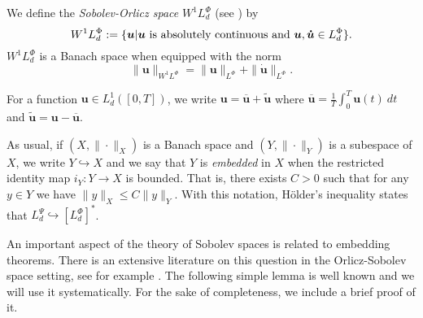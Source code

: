 \documentclass[twoside]{article}
\newcounter{nota_fer_cont}
\theoremstyle{remark}
\newcommand{\orlnor}{\|_{L^{\Phi}}}
\newcommand{\lphi}{L^{\Phi}}
\newcommand{\lpsi}{L^{\Psi}}
\newcommand{\ephi}{E^{\Phi}}
\newcommand{\claseor}{C^{\Phi}}
\newcommand{\wphi}{W^{1}\lphi}
\renewcommand{\b}[1]{\boldsymbol{#1}}
\renewcommand{\leq}{\leqslant}
\begin{document}

We define the \emph{Sobolev-Orlicz space} $\wphi_d$ (see \cite{adams_sobolev}) by
\[\wphi_d:=\{\b{u}| \b{u} \hbox{ is absolutely continuous and } \b{u},\b{\dot{u}}\in \lphi_d\}.\]
$\wphi_d$ is a Banach space when equipped with the norm
\[
\|  \b{u}  \|_{\wphi}= \|  \b{u}  \|_{\lphi} + \|\b{\dot{u}}\orlnor.
\]



For a  function $\b{u}\in L^1_d([0,T])$, we write $\b{u}=\overline{\b{u}}+\widetilde{\b{u}}$ where $\overline{\b{u}} =\frac1T\int_0^T \b{u}(t)\ dt$ and $\widetilde{\b{u}}=\b{u}-\overline{\b{u}}$.

As usual, if $(X,\|\cdot\|_X)$ is a Banach space and $(Y,\|\cdot \|_Y)$ is a subespace of $X$,  we write $Y\hookrightarrow X$ and we say that $Y$ is \emph{embedded} in $X$  when the restricted identity map $i_Y:Y\to X$ is bounded. That is, there exists $C>0$ such that  for any $y\in Y$ we have $\|y\|_X\leq C\|y\|_Y$.  With this notation, H\"older's inequality states that  $\lpsi_d\hookrightarrow  \left[\lphi_d\right]^*$.




 An important aspect of the theory of Sobolev spaces is related to embedding theorems. There is an extensive literature on this question in the  Orlicz-Sobolev space setting, see for example
 \cite{cianchi2000fully,cianchi1999some,claverooptimal,edmunds2000optimal,kerman2006optimal}.
The following simple lemma is well known and we will use it systematically. For the sake of completeness, we include a brief proof of it.
\end{document}
